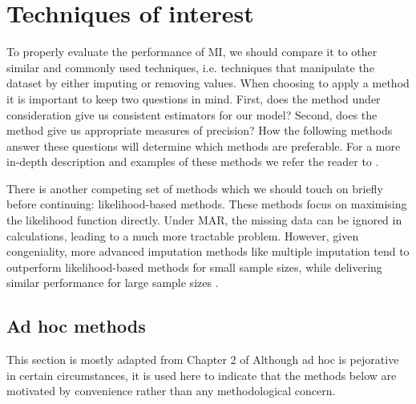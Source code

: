 \documentclass{article}
\begin{document}
	
	\section{Techniques of interest}
	To properly evaluate the performance of MI, we should compare it to other similar and commonly used techniques, i.e. techniques that manipulate the dataset by either imputing or removing values. When choosing to apply a method it is important to keep two questions in mind. First, does the method under consideration give us consistent estimators for our model? Second, does the method give us appropriate measures of precision? How the following methods answer these questions will determine which methods are preferable. For a more in-depth description and examples of these methods we refer the reader to \cite{Molenberghs2015}.
	
	There is another competing set of methods which we should touch on briefly before continuing: likelihood-based methods. These methods focus on maximising the likelihood function directly. Under MAR, the missing data can be ignored in calculations, leading to a much more tractable problem. However, given congeniality, more advanced imputation methods like multiple imputation tend to outperform likelihood-based methods for small sample sizes, while delivering similar performance for large sample sizes \cite{schafer_multiple_2016}.
	
	\subsection{Ad hoc methods}
	This section is mostly adapted from Chapter 2 of \cite{Molenberghs2015} Although ad hoc is pejorative in certain circumstances, it is used here to indicate that the methods below are motivated by convenience rather than any methodological concern.
	
\end{document}

